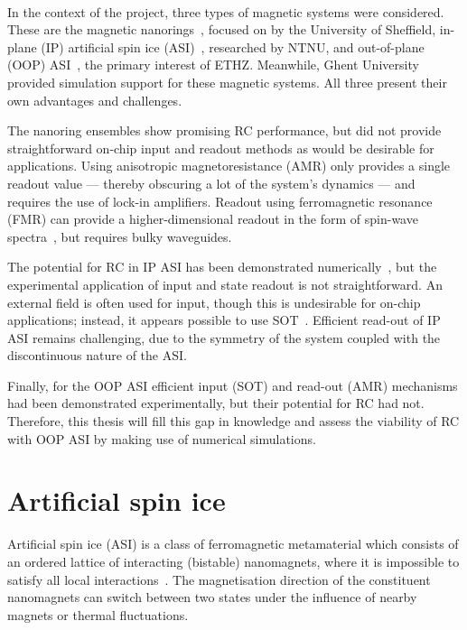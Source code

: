 \paragraph{\spinengine}
In the context of the \spinengine project, three types of magnetic systems were considered.
These are the magnetic nanorings~\cite{DynamicEmergence_NanomagneticSystem}, focused on by the University of Sheffield, in-plane (IP) artificial spin ice (ASI)~\cite{RC_ASI}, researched by NTNU, and out-of-plane (OOP) ASI~\cite{KUR-24}, the primary interest of ETHZ.
Meanwhile, Ghent University provided simulation support for these magnetic systems.
All three present their own advantages and challenges. \par
The nanoring ensembles show promising RC performance, but did not provide straightforward on-chip input and readout methods as would be desirable for applications.
Using anisotropic magnetoresistance (AMR) only provides a single readout value --- thereby obscuring a lot of the system's dynamics --- and requires the use of lock-in amplifiers.
Readout using ferromagnetic resonance (FMR) can provide a higher-dimensional readout in the form of spin-wave spectra~\cite{swindells2024fingerprinting}, but requires bulky waveguides. \par
The potential for RC in IP ASI has been demonstrated numerically~\cite{RC_ASI}, but the experimental application of input and state readout is not straightforward.
An external field is often used for input, though this is undesirable for on-chip applications; instead, it appears possible to use SOT~\cite{SOT_switching_IP}.
Efficient read-out of IP ASI remains challenging, due to the symmetry of the system coupled with the discontinuous nature of the ASI. \par %
Finally, for the OOP ASI efficient input (SOT) and read-out (AMR) mechanisms had been demonstrated experimentally, but their potential for RC had not.
Therefore, this thesis will fill this gap in knowledge and assess the viability of RC with OOP ASI by making use of numerical simulations.

\newpage
\section{Artificial spin ice}\label{sec:1:ASI} %
Artificial spin ice (ASI) is a class of ferromagnetic metamaterial which consists of an ordered lattice of interacting (bistable) nanomagnets, where it is impossible to satisfy all local interactions~\cite{RC_ASI}. %
The magnetisation direction of the constituent nanomagnets can switch between two states under the influence of nearby magnets or thermal fluctuations.


